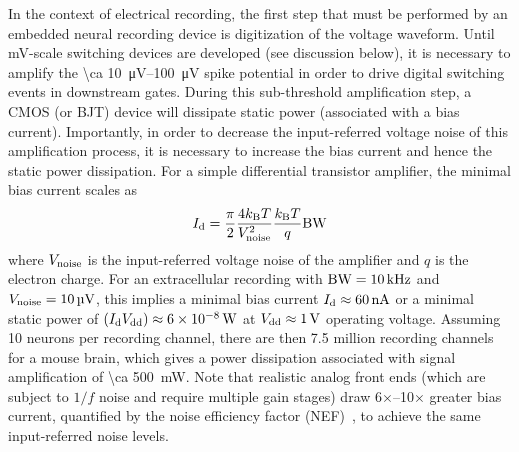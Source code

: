 In the context of electrical recording, the first step that must be performed by an embedded neural recording device is digitization of the voltage waveform.
Until \si{\milli\volt}-scale switching devices are developed (see discussion below), it is necessary to amplify the \SIrange{\ca 10}{100}{\micro\volt} spike potential in order to drive digital switching events in downstream gates.
During this sub-threshold amplification step, a CMOS (or BJT) device will dissipate static power (associated with a bias current). 
Importantly, in order to decrease the input-referred voltage noise of this amplification process, it is necessary to increase the bias current and hence the static power dissipation.
For a simple differential transistor amplifier, the minimal bias current scales as
\[I_{\text{\scriptsize d}} = \frac{\pi}{2} \frac{4k_{\text{\scriptsize B}} T}{V_{\text{\scriptsize noise}}^2} \frac{k_{\text{\scriptsize B}} T}{q} \text{BW}\]
where $V_{\text{\scriptsize noise}}$ is the input-referred voltage noise of the amplifier and $q$ is the electron charge.
For an extracellular recording with $\text{BW} = \SI{10}{\kilo\hertz}$ and $V_{\text{\scriptsize noise}} = \SI{10}{\micro\volt}$, this implies a minimal bias current $I_{\text{\scriptsize d}}\approx\SI{60}{\nano\ampere}$ or a minimal static power of $\left(I_{\text{\scriptsize d}} V_{\text{\scriptsize dd}}\right)\approx\SI{6e-8}{\watt}$ at $V_{\text{\scriptsize dd}}\approx\SI{1}{\volt}$ operating voltage.
Assuming 10 neurons per recording channel, there are then 7.5 million recording channels for a mouse brain, which gives a power dissipation associated with signal amplification of \SI{\ca 500}{\milli\watt}.
Note that realistic analog front ends (which are subject to $1/f$ noise and require multiple gain stages) draw 6$\times$--10$\times$ greater bias current, quantified by the noise efficiency factor (NEF)~\cite{steyaert87}, to achieve the same input-referred noise levels.

